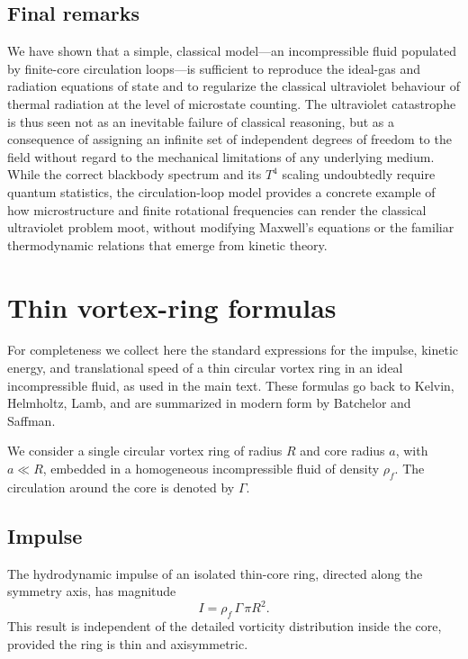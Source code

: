 \documentclass[11pt]{article}
\begin{document}
        \subsection{Final remarks}

            We have shown that a simple, classical model---an incompressible fluid populated by
            finite-core circulation loops---is sufficient to reproduce the ideal-gas and
            radiation equations of state and to regularize the classical ultraviolet behaviour
            of thermal radiation at the level of microstate counting. The ultraviolet catastrophe
            is thus seen not as an inevitable failure of classical reasoning, but as a consequence
            of assigning an infinite set of independent degrees of freedom to the field without
            regard to the mechanical limitations of any underlying medium. While the correct
            blackbody spectrum and its $T^4$ scaling undoubtedly require quantum statistics,
            the circulation-loop model provides a concrete example of how microstructure and
            finite rotational frequencies can render the classical ultraviolet problem moot,
            without modifying Maxwell's equations or the familiar thermodynamic relations that
            emerge from kinetic theory.


        \appendix

    \section{Thin vortex-ring formulas}
    \label{app:vortex-ring-formulas}

    For completeness we collect here the standard expressions for the impulse, kinetic
    energy, and translational speed of a thin circular vortex ring in an ideal incompressible
    fluid, as used in the main text. These formulas go back to Kelvin, Helmholtz, Lamb,
    and are summarized in modern form by Batchelor and Saffman.

    We consider a single circular vortex ring of radius $R$ and core radius $a$,
    with $a \ll R$, embedded in a homogeneous incompressible fluid of density $\rho_f$.
    The circulation around the core is denoted by $\Gamma$.

    \subsection{Impulse}

        The hydrodynamic impulse of an isolated thin-core ring, directed along the symmetry
        axis, has magnitude
        \begin{equation}
            I
            = \rho_f \,\Gamma\, \pi R^2.
            \label{eq:ring-impulse}
        \end{equation}
        This result is independent of the detailed vorticity distribution inside the core, provided
        the ring is thin and axisymmetric.
\end{document}
